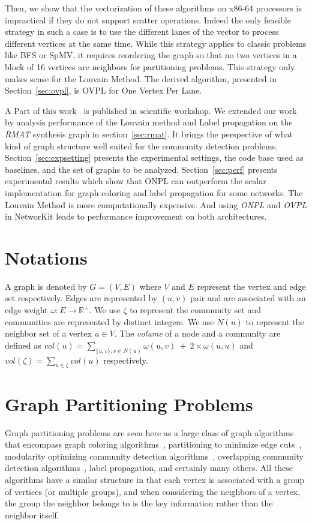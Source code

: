 \documentclass[default,iicol]{sn-jnl}%
\theoremstyle{thmstyleone}%
\theoremstyle{thmstyletwo}%
\theoremstyle{thmstylethree}%
\begin{document}
Then, we show that the vectorization of these algorithms on x86-64 processors is impractical if they do 
not support scatter operations. Indeed the only feasible strategy in such a case is to use the different 
lanes of the vector to process different vertices at the same time. While this strategy applies to classic 
problems like BFS or SpMV, it requires reordering the graph so that no two vertices in a block of 16 vertices 
are neighbors for partitioning problems. This strategy only makes sense for the Louvain Method. The derived 
algorithm,  presented in Section~\ref{sec:ovpl}, is OVPL for One Vertex Per Lane.

A Part of this work~\cite{hossain2021impact} is published in scientific workshop. 
We extended our work by analysis performance of the Louvain method and Label 
propagation on the \textit{RMAT} synthesis graph in section~\ref{sec:rmat}. 
It brings the perspective of what kind of graph structure well suited for the 
community detection problems. Section~\ref{sec:expsetting} presents the 
experimental settings, the code base used as baselines, and the set of graphs to 
be analyzed.  Section~\ref{sec:perf} presents experimental results which show 
that ONPL can outperform the scalar implementation for graph coloring and label 
propagation for some networks. The Louvain Method is more computationally 
expensive. And using \textit{ONPL} and \textit{OVPL} in NetworKit leads to 
performance improvement on both architectures.


\section{Notations}
A graph is denoted by
$G=(V, E)$ where $V$ and $E$ represent the vertex and edge set
respectively.  Edges are represented by $(u, v)$ pair and are associated with an edge weight
$\omega: E\rightarrow \mathbb{R}^{+}$.  We use $\zeta$ to represent
the community set and communities are represented
by distinct  integers. We use $N(u)$ to represent the neighbor set of a vertex
$u \in V$. The \textit{volume} of a node and a community are defined as 
$vol(u) = \sum_{\{u,v\}:v\in N(u)}\omega(u,v)\ +\ 2\times\omega(u,u)$ and $vol(\zeta) = \sum_{u\in\zeta}vol(u)$ respectively.


\section{Graph Partitioning Problems}
\label{sec:problem}
Graph partitioning problems are seen here as a large class of graph
algorithms that encompass graph coloring
algorithms~\cite{deveci2016parallel,matula1972graph,lewandowski1995practical}, partitioning to minimize edge
cuts~\cite{Karypis99}, modularity optimizing community detection
algorithms~\cite{Vincent,raghavan2007near}, overlapping community detection
algorithms~\cite{xie2013overlapping}, label propagation, and certainly many others. All
these algorithms have a similar structure in that each vertex
is associated with a group of vertices (or multiple groups), and 
when considering the neighbors of a vertex, the group the neighbor belongs
to is the key information rather than the neighbor itself.
\end{document}

